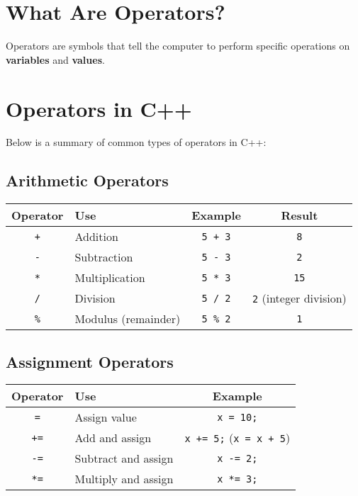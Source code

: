 \documentclass{article}
\begin{document}
\section{What Are Operators?}

Operators are symbols that tell the computer to perform specific operations on \textbf{variables} and \textbf{values}.

\section*{Operators in C++}

Below is a summary of common types of operators in C++:

\renewcommand{\arraystretch}{1.5}
\setlength{\tabcolsep}{10pt}

\subsection*{Arithmetic Operators}

\begin{center}
\begin{tabular}{|c|l|c|c|}
\hline
\textbf{Operator} & \textbf{Use} & \textbf{Example} & \textbf{Result} \\
\hline
\texttt{+} & Addition & \texttt{5 + 3} & \texttt{8} \\
\hline
\texttt{-} & Subtraction & \texttt{5 - 3} & \texttt{2} \\
\hline
\texttt{*} & Multiplication & \texttt{5 * 3} & \texttt{15} \\
\hline
\texttt{/} & Division & \texttt{5 / 2} & \texttt{2} (integer division) \\
\hline
\texttt{\%} & Modulus (remainder) & \texttt{5 \% 2} & \texttt{1} \\
\hline
\end{tabular}
\end{center}

\subsection*{Assignment Operators}

\begin{center}
\begin{tabular}{|c|l|c|}
\hline
\textbf{Operator} & \textbf{Use} & \textbf{Example} \\
\hline
\texttt{=} & Assign value & \texttt{x = 10;} \\
\hline
\texttt{+=} & Add and assign & \texttt{x += 5;} (\texttt{x = x + 5}) \\
\hline
\texttt{-=} & Subtract and assign & \texttt{x -= 2;} \\
\hline
\texttt{*=} & Multiply and assign & \texttt{x *= 3;} \\
\hline
\end{tabular}
\end{center}
\end{document}
